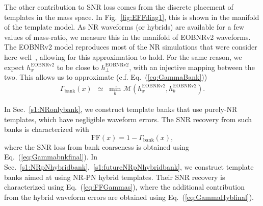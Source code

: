 \documentclass[aps,
prd,
twocolumn,
superscriptaddress,
lengthcheck,showpacs,letterpaper,nofootinbib,
floatfix]{revtex4-1}
\newcommand{\EOB}{\mathrm{EOBNRv2}}
\newcommand{\bnk}{\mathrm{bank}}
\newcommand{\mn}{\mathrm{min}}
\newcommand{\FF}{\mathrm{FF}}
\begin{document}
The other contribution to SNR loss comes from the discrete placement of 
templates in the mass space. In Fig.~\ref{fig:EFFdiag1}, this is shown in the
manifold of the template model. As NR waveforms (or hybrids) are available
for a few values of mass-ratio, we measure this in the manifold of EOBNRv2
waveforms. The EOBNRv2 model reproduces most of the NR simulations that
were consider here well~\cite{BuonannoEOBv2Main}, allowing for this 
approximation to hold. For the same reason, we expect $h^\EOB_x$ to be close to 
$h^\EOB_\perp$, with an injective mapping between the two. This allows us to 
approximate (c.f. Eq.~(\ref{eq:GammaBank}))
\begin{eqnarray}\label{eq:GammaBankEOB}
\label{eq:Gammabnkfinal}
 \Gamma_\bnk(x) &\simeq & \underset{b}{\mn}\,\,\mathcal{M}(h^\EOB_x,h^\EOB_b).
\end{eqnarray}

In Sec.~\ref{s1:NRonlybank}, we construct template banks that use purely-NR
templates, which have negligible waveform errors. The SNR recovery from such 
banks is characterized with
\begin{equation}\label{eq:NRFFGammas}
 \FF(x) = 1 - \Gamma_\bnk(x),
\end{equation}
where the SNR loss from bank coarseness is obtained using 
Eq.~(\ref{eq:Gammabnkfinal}). In 
Sec.~\ref{s1:NRpNhybridbank},~\ref{s1:futureNRpNhybridbank}, we construct 
template banks aimed at using NR-PN hybrid templates. Their SNR recovery is
characterized using Eq.~(\ref{eq:FFGammas}), where the additional contribution
from the hybrid waveform errors are obtained using Eq.~(\ref{eq:GammaHybfinal}).
\end{document}
